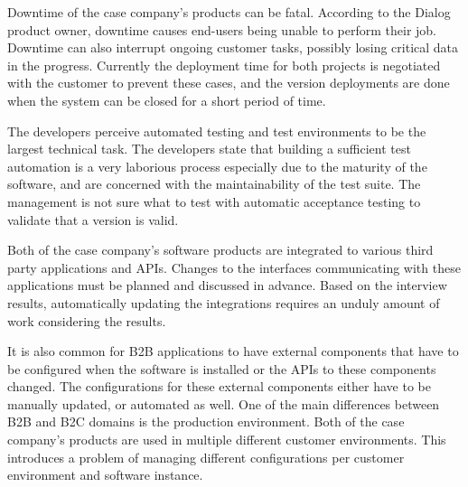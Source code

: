 \documentclass[lnbip]{svmultln}
\begin{document}
Downtime of the case company's products can be fatal. According to the Dialog product owner, downtime causes end-users being unable to perform their job. Downtime can also interrupt ongoing customer tasks, possibly losing critical data in the progress. Currently the deployment time for both projects is negotiated with the customer to prevent these cases, and the version deployments are done when the system can be closed for a short period of time. 

The developers perceive automated testing and test environments to be the largest technical task. The developers state that building a sufficient test automation is a very laborious process especially due to the maturity of the software, and are concerned with the maintainability of the test suite. The management is not sure what to test with automatic acceptance testing to validate that a version is valid. 

Both of the case company's software products are integrated to various third party applications and APIs. Changes to the interfaces communicating with these applications must be planned and discussed in advance. Based on the interview results, automatically updating the integrations requires an unduly amount of work considering the results. 

It is also common for B2B applications to have external components that have to be configured when the software is installed or the APIs to these components changed. The configurations for these external components either have to be manually updated, or automated as well. One of the main differences between B2B and B2C domains is the production environment. Both of the case company's products are used in multiple different customer environments. This introduces a problem of managing different configurations per customer environment and software instance.



\end{document}
